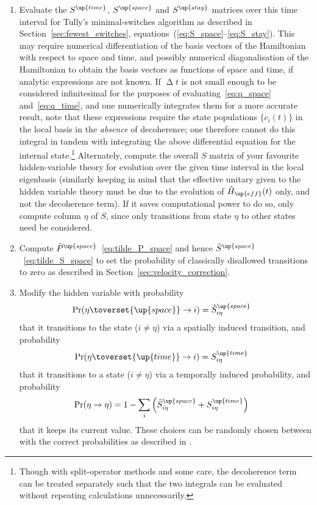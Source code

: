 \begin{enumerate}
    \item Evaluate the $S^\up{time}$, $S^\up{space}$ and $S^\up{stay}$ matrices over this time interval for Tully's minimal-switches algorithm as described in Section~\ref{sec:fewest_switches}, equations~(\ref{eq:S_space}--\ref{eq:S_stay}). This may require numerical differentiation of the basis vectors of the Hamiltonian with respect to space and time, and possibly numerical diagonalisation of the Hamiltonian to obtain the basis vectors as functions of space and time, if analytic expressions are not known. If $\upDelta t$ is not small enough to be considered infinitesimal for the purposes of evaluating~\eqref{eq:q_space} and~\eqref{eq:q_time}, and one numerically integrates them for a more accurate result, note that these expressions require the state populations $\{c_i(t)\}$ in the local basis in the \emph{absence} of decoherence; one therefore cannot do this integral in tandem with integrating the above differential equation for the internal state.\footnote{Though with split-operator methods and some care, the decoherence term can be treated separately such that the two integrals can be evaluated without repeating calculations unnecessarily.} Alternately, compute the overall $S$ matrix of your favourite hidden-variable theory for evolution over the given time interval in the local eigenbasis (similarly keeping in mind that the effective unitary given to the hidden variable theory must be due to the evolution of $\hat H_\up{eff}(t)$ only, and not the decoherence term). If it saves computational power to do so, only compute column $\eta$ of $S$, since only transitions from state $\eta$ to other states need be considered.

    \item Compute $\tilde P^\up{space}$~\eqref{eq:tilde_P_space} and hence $\tilde S^\up{space}$~\eqref{eq:tilde_S_space} to set the probability of classically disallowed transitions to zero as described in Section~\ref{sec:velocity_correction}.

    \item Modify the hidden variable with probability
    \begin{align}
    \Pr(\eta\toverset{\up{space}}\rightarrow i) &= \tilde S^\up{space}_{i\eta}
    \end{align}
    that it transitions to the state ($i\neq\eta$) via a spatially induced transition, and probability
    \begin{align}
    \Pr(\eta\toverset{\up{time}}\rightarrow i) &= S^\up{time}_{i\eta}
    \end{align}
    that it transitions to a state ($i\neq\eta$) via a temporally induced probability, and probability
    \begin{align}
    \Pr(\eta\rightarrow\eta) &= 1 - \sum_i \left(\tilde S^\up{space}_{i\eta} + S^\up{time}_{i\eta}\right)
    \end{align}
    that it keeps its current value. These choices can be randomly chosen between with the correct probabilities as described in .


\end{enumerate}
